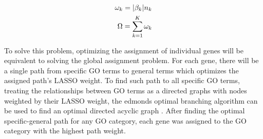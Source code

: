 \begin{align}
\omega_{k} = |\beta_{k}|n_{k}\notag\\
\Omega = \sum_{k = 1}^{K}\omega_{k}\label{eq:lassoOptimProb}
\end{align}

To solve this problem, optimizing the assignment of individual genes will be equivalent to solving the global assignment problem. For each gene, there will be a single path from specific GO terms to general terms which optimizes the assigned path's LASSO weight. To find such path to all specific GO terms, treating the relationships between GO terms as a directed graphs with nodes weighted by their LASSO weight, the edmonds optimal branching algorithm can be used to find an optimal directed acyclic graph \cite{Edmonds:1967ta}. After finding the optimal specific-general path for any GO category, each gene was assigned to the GO category with the highest path weight.